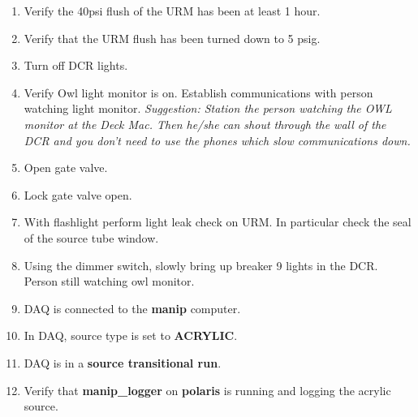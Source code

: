 \begin{enumerate}
   
\begin{center}
            {\bf Deploying Source from Source Tube Into Glovebox}
\end{center}

 \item\checkbox Verify the 40psi flush of the URM has been at least 1 hour.

 \item\checkbox Verify that the URM flush has been turned down to 5 psig.

 \item\checkbox Turn off DCR lights.

 \item\checkbox Verify Owl light monitor is on.  Establish communications
  with person watching light monitor.
  \small
  {\em
    Suggestion:  Station the person watching the OWL monitor at
    the Deck Mac.  Then he/she can shout through the  wall of the
    DCR and you don't need to use the phones which slow communications
    down.
  }
  \normalsize

 \item\checkbox Open gate valve.

 \item\checkbox Lock gate valve open.

 \item\checkbox With flashlight perform light leak check on URM.  In particular
   check the seal of the source tube window.

 \item\checkbox Using the dimmer switch, slowly bring up breaker 9 lights in
   the DCR.  Person still watching owl monitor.

 \item\checkbox DAQ is connected to the {\bf manip} computer.

 \item \checkbox In DAQ, source type is set to {\bf ACRYLIC}.

 \item\checkbox DAQ is in a {\bf source transitional run}.

 \item \checkbox Verify that {\bf manip\_logger} on {\bf polaris}
                 is running and logging the acrylic source.


\end{enumerate}
